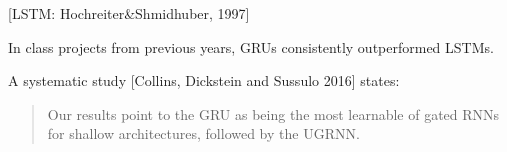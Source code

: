 {\centerline{\Large [LSTM: Hochreiter\&Shmidhuber, 1997]}


\vfill
In class projects from previous years, GRUs consistently outperformed LSTMs.

\vfill
A systematic study [Collins, Dickstein and Sussulo 2016] states:

\begin{quotation}
  Our results point to the GRU as being the most learnable of gated RNNs for shallow architectures, followed by the UGRNN.
\end{quotation}


}

